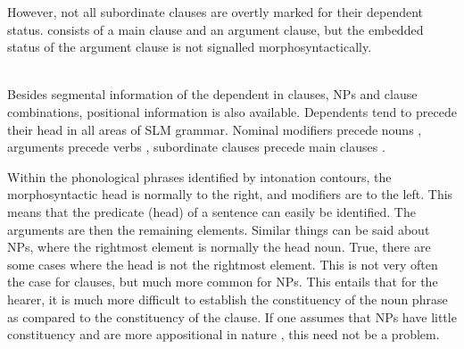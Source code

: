 However, not all subordinate clauses are overtly marked for their dependent status.  consists of a main clause and an argument clause, but the embedded status of the argument clause is not signalled morphosyntactically.

\\

Besides segmental information of the dependent in clauses, NPs and clause combinations, positional information is also available. Dependents tend to precede their head in all areas of SLM grammar. Nominal modifiers precede nouns , arguments precede verbs , subordinate clauses precede main clauses .

Within the phonological phrases identified by intonation contours, the morphosyntactic head is normally to the right, and modifiers are to the left. This means that the predicate (head) of a sentence can easily be identified. The arguments are then the remaining elements. Similar things can be said about NPs, where the rightmost element is normally the head noun. True, there are some cases where the head is not the rightmost element. This is not very often the case for clauses, but much more common for NPs. This entails that for the hearer, it is much more difficult to establish the constituency of the noun phrase as compared to the constituency of the clause. If one assumes that NPs have little constituency and are more appositional in nature , this need not be a problem.

